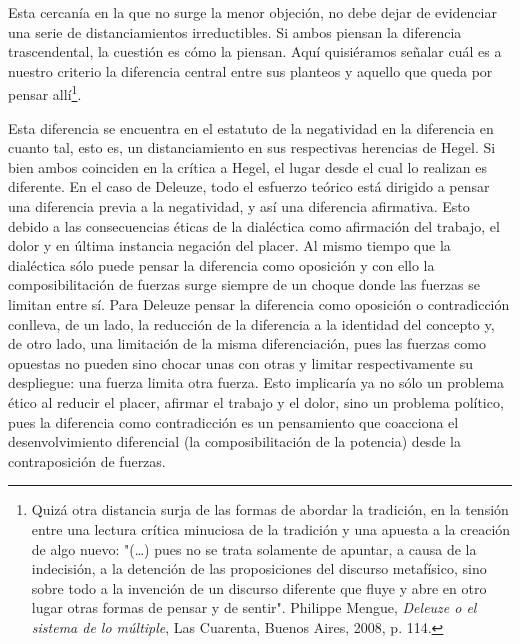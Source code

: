 \documentclass{book}
\begin{document}
Esta cercanía en la que no surge la menor objeción, no debe dejar de
evidenciar una serie de distanciamientos irreductibles. Si ambos piensan
la diferencia trascendental, la cuestión es cómo la piensan. Aquí
quisiéramos señalar cuál es a nuestro criterio la diferencia central
entre sus planteos y aquello que queda por pensar allí\footnote{Quizá
  otra distancia surja de las formas de abordar la tradición, en la
  tensión entre una lectura crítica minuciosa de la tradición y una
  apuesta a la creación de algo nuevo: "(\dots) pues no se trata
  solamente de apuntar, a causa de la indecisión, a la detención de las
  proposiciones del discurso metafísico, sino sobre todo a la invención
  de un discurso diferente que fluye y abre en otro lugar otras formas
  de pensar y de sentir". Philippe Mengue, \emph{Deleuze o el sistema de
  lo múltiple}, Las Cuarenta, Buenos Aires, 2008, p. 114.}.

Esta diferencia se encuentra en el estatuto de la negatividad en la
diferencia en cuanto tal, esto es, un distanciamiento en sus respectivas
herencias de Hegel. Si bien ambos coinciden en la crítica a Hegel, el
lugar desde el cual lo realizan es diferente. En el caso de Deleuze,
todo el esfuerzo teórico está dirigido a pensar una diferencia previa a
la negatividad, y así una diferencia afirmativa. Esto debido a las
consecuencias éticas de la dialéctica como afirmación del trabajo, el
dolor y en última instancia negación del placer. Al mismo tiempo que la
dialéctica sólo puede pensar la diferencia como oposición y con ello la
composibilitación de fuerzas surge siempre de un choque donde las
fuerzas se limitan entre sí. Para Deleuze pensar la diferencia como
oposición o contradicción conlleva, de un lado, la reducción de la
diferencia a la identidad del concepto y, de otro lado, una limitación
de la misma diferenciación, pues las fuerzas como opuestas no pueden
sino chocar unas con otras y limitar respectivamente su despliegue: una
fuerza limita otra fuerza. Esto implicaría ya no sólo un problema ético
al reducir el placer, afirmar el trabajo y el dolor, sino un problema
político, pues la diferencia como contradicción es un pensamiento que
coacciona el desenvolvimiento diferencial (la composibilitación de la
potencia) desde la contraposición de fuerzas.
\end{document}
